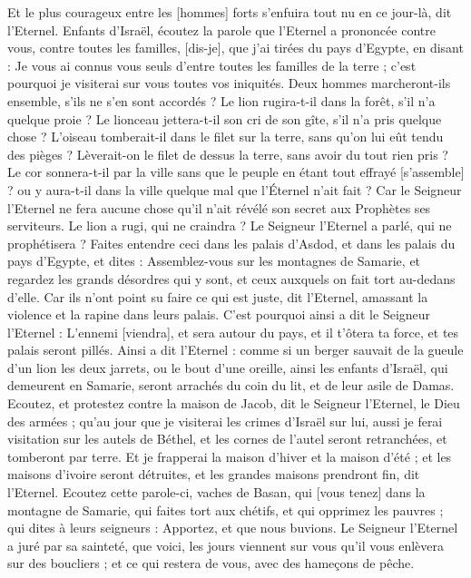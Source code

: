 \begin{multicols}{2}
Et le plus courageux entre les [hommes] forts s'enfuira tout nu en ce jour-là, dit l'Eternel.
\VerseOne{}Enfants d'Israël, écoutez la parole que l'Eternel a prononcée contre vous, contre toutes les familles, [dis-je], que j'ai tirées du pays d'Egypte, en disant :
Je vous ai connus vous seuls d'entre toutes les familles de la terre ; c'est pourquoi je visiterai sur vous toutes vos iniquités.
Deux hommes marcheront-ils ensemble, s'ils ne s'en sont accordés ?
Le lion rugira-t-il dans la forêt, s'il n'a quelque proie ? Le lionceau jettera-t-il son cri de son gîte, s'il n'a pris quelque chose ?
L'oiseau tomberait-il dans le filet sur la terre, sans qu'on lui eût tendu des pièges ? Lèverait-on le filet de dessus la terre, sans avoir du tout rien pris ?
Le cor sonnera-t-il par la ville sans que le peuple en étant tout effrayé [s'assemble] ? ou y aura-t-il dans la ville quelque mal que l'Éternel n'ait fait ?
Car le Seigneur l'Eternel ne fera aucune chose qu'il n'ait révélé son secret aux Prophètes ses serviteurs.
Le lion a rugi, qui ne craindra ? Le Seigneur l'Eternel a parlé, qui ne prophétisera ?
Faites entendre ceci dans les palais d'Asdod, et dans les palais du pays d'Egypte, et dites : Assemblez-vous sur les montagnes de Samarie, et regardez les grands désordres qui y sont, et ceux auxquels on fait tort au-dedans d'elle.
Car ils n'ont point su faire ce qui est juste, dit l'Eternel, amassant la violence et la rapine dans leurs palais.
C'est pourquoi ainsi a dit le Seigneur l'Eternel : L'ennemi [viendra], et sera autour du pays, et il t'ôtera ta force, et tes palais seront pillés.
Ainsi a dit l'Eternel : comme si un berger sauvait de la gueule d'un lion les deux jarrets, ou le bout d'une oreille, ainsi les enfants d'Israël, qui demeurent en Samarie, seront arrachés du coin du lit, et de leur asile de Damas.
Ecoutez, et protestez contre la maison de Jacob, dit le Seigneur l'Eternel, le Dieu des armées ;
qu'au jour que je visiterai les crimes d'Israël sur lui, aussi je ferai visitation sur les autels de Béthel, et les cornes de l'autel seront retranchées, et tomberont par terre.
Et je frapperai la maison d'hiver et la maison d'été ; et les maisons d'ivoire seront détruites, et les grandes maisons prendront fin, dit l'Eternel.
\VerseOne{}Ecoutez cette parole-ci, vaches de Basan, qui [vous tenez] dans la montagne de Samarie, qui faites tort aux chétifs, et qui opprimez les pauvres ; qui dites à leurs seigneurs : Apportez, et que nous buvions.
Le Seigneur l'Eternel a juré par sa sainteté, que voici, les jours viennent sur vous qu'il vous enlèvera sur des boucliers ; et ce qui restera de vous, avec des hameçons de pêche.

\end{multicols}
